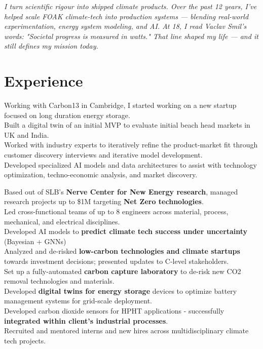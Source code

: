 \documentclass{../../templates/karthicv-single}
\begin{document}
\maketitle

\vspace{-1em}
\begin{center}
\textit{I turn scientific rigour into shipped climate products. Over the past 12 years, I've helped scale FOAK climate-tech into production systems — blending real-world experimentation, energy system modeling, and AI. At 18, I read Vaclav Smil's words: "Societal progress is measured in watts." That line shaped my life — and it still defines my mission today.}
\end{center}

\section{Experience}
{Working with Carbon13 in Cambridge, I started working on a new startup focused on long duration energy storage.\\
Built a digital twin of an initial MVP to evaluate initial beach head markets in UK and India. \\
Worked with industry experts to iteratively refine the product-market fit through customer discovery interviews and iterative model development.\\
Developed specialized AI models and data architectures to assist with technology optimization, techno-economic analysis, and market discovery.}

{Based out of SLB's \textbf{Nerve Center for New Energy research}, managed research projects up to \$1M targeting \textbf{Net Zero technologies}. \\
Led cross-functional teams of up to 8 engineers across material, process, mechanical, and electrical disciplines. \\
Developed AI models to \textbf{predict climate tech success under uncertainty} (Bayesian + GNNs) \\
Analyzed and de-risked \textbf{low-carbon technologies and climate startups} towards investment decisions; presented updates to C-level stakeholders. \\
Set up a fully-automated \textbf{carbon capture laboratory} to de-risk new CO2 removal technologies and materials. \\
Developed \textbf{digital twins for energy storage} devices to optimize battery management systems for grid-scale deployment. \\
Developed carbon dioxide sensors for HPHT applications - successfully \textbf{integrated within client's industrial processes}. \\
Recruited and mentored interns and new hires across multidisciplinary climate tech projects.}
\end{document}
